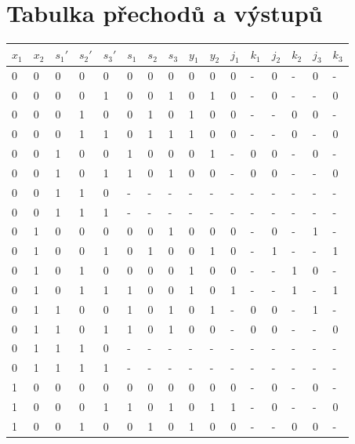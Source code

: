\documentclass[titlepage]{article}
\begin{document}
\section{Tabulka přechodů a výstupů}
\begin{center}
\begin{tabular}{|l|l|l|l|l|l|l|l|l|l|l|l|l|l|l|l|}
\hline
{\bf $x_1$} & {\bf $x_2$} & {\bf $s_1'$} & {\bf $s_2'$} & {\bf $s_3'$} & {\bf
$s_1$} & {\bf $s_2$} & {\bf $s_3$} & {\bf $y_1$} & {\bf $y_2$} & {\bf $j_1$} & {\bf $k_1$} & {\bf $j_2$} & {\bf $k_2$} & {\bf $j_3$} & {\bf $k_3$}\\
\hline
0 & 0 & 0 & 0 & 0 & 0 & 0 & 0 & 0 & 0 & 0 & - & 0 & - & 0 & - \\
0 & 0 & 0 & 0 & 1 & 0 & 0 & 1 & 0 & 1 & 0 & - & 0 & - & - & 0 \\
0 & 0 & 0 & 1 & 0 & 0 & 1 & 0 & 1 & 0 & 0 & - & - & 0 & 0 & - \\
0 & 0 & 0 & 1 & 1 & 0 & 1 & 1 & 1 & 0 & 0 & - & - & 0 & - & 0 \\
0 & 0 & 1 & 0 & 0 & 1 & 0 & 0 & 0 & 1 & - & 0 & 0 & - & 0 & - \\
0 & 0 & 1 & 0 & 1 & 1 & 0 & 1 & 0 & 0 & - & 0 & 0 & - & - & 0 \\
0 & 0 & 1 & 1 & 0 & - & - & - & - & - & - & - & - & - & - & - \\
0 & 0 & 1 & 1 & 1 & - & - & - & - & - & - & - & - & - & - & - \\
0 & 1 & 0 & 0 & 0 & 0 & 0 & 1 & 0 & 0 & 0 & - & 0 & - & 1 & - \\
0 & 1 & 0 & 0 & 1 & 0 & 1 & 0 & 0 & 1 & 0 & - & 1 & - & - & 1 \\
0 & 1 & 0 & 1 & 0 & 0 & 0 & 0 & 1 & 0 & 0 & - & - & 1 & 0 & - \\
0 & 1 & 0 & 1 & 1 & 1 & 0 & 0 & 1 & 0 & 1 & - & - & 1 & - & 1 \\
0 & 1 & 1 & 0 & 0 & 1 & 0 & 1 & 0 & 1 & - & 0 & 0 & - & 1 & - \\
0 & 1 & 1 & 0 & 1 & 1 & 0 & 1 & 0 & 0 & - & 0 & 0 & - & - & 0 \\
0 & 1 & 1 & 1 & 0 & - & - & - & - & - & - & - & - & - & - & - \\
0 & 1 & 1 & 1 & 1 & - & - & - & - & - & - & - & - & - & - & - \\
1 & 0 & 0 & 0 & 0 & 0 & 0 & 0 & 0 & 0 & 0 & - & 0 & - & 0 & - \\
1 & 0 & 0 & 0 & 1 & 1 & 0 & 1 & 0 & 1 & 1 & - & 0 & - & - & 0 \\
1 & 0 & 0 & 1 & 0 & 0 & 1 & 0 & 1 & 0 & 0 & - & - & 0 & 0 & - \\

\end{tabular}
\end{center}
\end{document}
